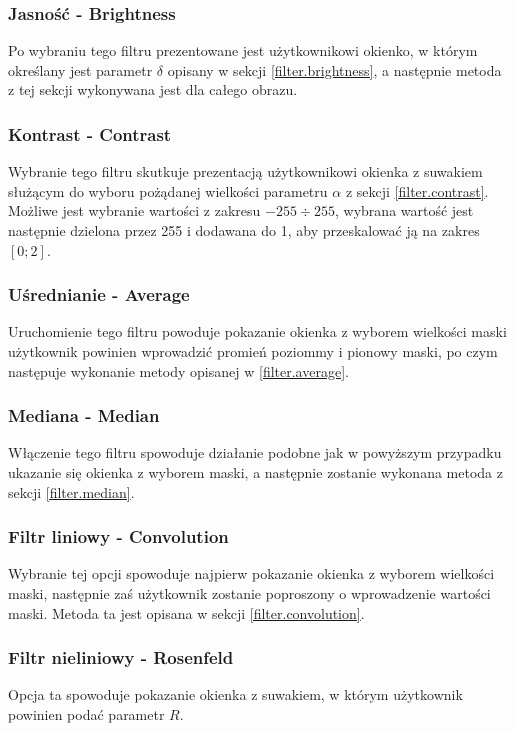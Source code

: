 \documentclass{classrep}
\begin{document}
\subsubsection{Jasność - Brightness}
Po wybraniu tego filtru prezentowane jest użytkownikowi okienko, w którym określany jest parametr $\delta$ opisany w sekcji \ref{filter.brightness}, a następnie metoda z tej sekcji wykonywana jest dla całego obrazu.

\subsubsection{Kontrast - Contrast}
Wybranie tego filtru skutkuje prezentacją użytkownikowi okienka z suwakiem służącym do wyboru pożądanej wielkości parametru $\alpha$ z sekcji \ref{filter.contrast}. Możliwe jest wybranie wartości z zakresu $-255 \div 255$, wybrana wartość jest następnie dzielona przez 255 i dodawana do 1, aby przeskalować ją na zakres $[0; 2]$.

\subsubsection{Uśrednianie - Average}
Uruchomienie tego filtru powoduje pokazanie okienka z wyborem wielkości maski \ppauza użytkownik powinien wprowadzić promień poziommy i pionowy maski, po czym następuje wykonanie metody opisanej w \ref{filter.average}.

\subsubsection{Mediana - Median}
Włączenie tego filtru spowoduje działanie podobne jak w powyższym przypadku \ppauza ukazanie się okienka z wyborem maski, a następnie zostanie wykonana metoda z sekcji \ref{filter.median}.

\subsubsection{Filtr liniowy - Convolution}
Wybranie tej opcji spowoduje najpierw pokazanie okienka z wyborem wielkości maski, następnie zaś użytkownik zostanie poproszony o wprowadzenie wartości maski. Metoda ta jest opisana w sekcji \ref{filter.convolution}.

\subsubsection{Filtr nieliniowy - Rosenfeld}
Opcja ta spowoduje pokazanie okienka z suwakiem, w którym użytkownik powinien podać parametr $R$.
\end{document}
